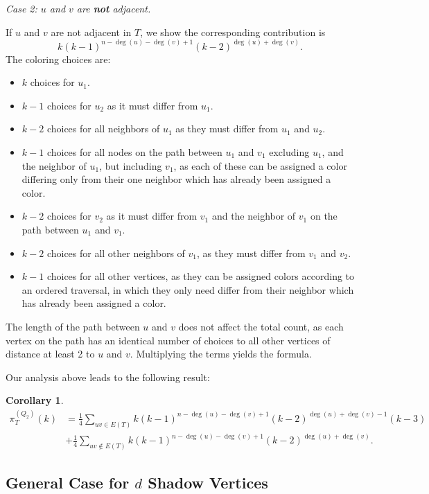 \documentclass[12pt,reqno,dvipsnames]{amsart}
\newtheorem{cor}[theorem]{Corollary}
\theoremstyle{definition}
\begin{document}
\smallskip 

\noindent\textit{Case 2: $u$ and $v$ are \textbf{not} adjacent.}

If $u$ and $v$ are not adjacent in $T$, we show the corresponding contribution is
$$
k (k - 1)^{n - \deg(u) - \deg(v) + 1} (k - 2)^{\deg(u) + \deg(v)}.
$$
The coloring choices are:
\begin{itemize}
    \item $k$ choices for $u_1$.
    \item $k - 1$ choices for $u_2$ as it must differ from $u_1$.
    \item $k - 2$ choices for all neighbors of $u_1$ as they must differ from $u_1$ and $u_2$.
    \item $k - 1$ choices for all nodes on the path between $u_1$ and $v_1$ excluding $u_1$, and the neighbor of $u_1$, but including $v_1$, as each of these can be assigned a color differing only from their one neighbor which has already been assigned a color.
    \item $k - 2$ choices for $v_2$ as it must differ from $v_1$ and the neighbor of $v_1$ on the path between $u_1$ and $v_1$.
    \item $k - 2$ choices for all other neighbors of $v_1$, as they must differ from $v_1$ and $v_2$.
    \item $k - 1$ choices for all other vertices, as they can be assigned colors according to an ordered traversal, in which they only need differ from their neighbor which has already been assigned a color.
\end{itemize}
The length of the path between $u$ and $v$ does not affect the total count, as each vertex on the path has an identical number of choices to all other vertices of distance at least 2 to $u$ and $v$. Multiplying the terms yields the formula.

Our analysis above leads to the following result:
\begin{cor}
\begin{align*}
    \pi^{(Q_2)}_T(k)&= \frac{1}{4}\sum_{uv\in E(T)} k (k - 1)^{n - \deg(u) - \deg(v) + 1} (k - 2)^{\deg(u) + \deg(v) - 1} (k - 3) \\ 
    & + \frac{1}{4}\sum_{uv\notin E(T)}k (k - 1)^{n - \deg(u) - \deg(v) + 1} (k - 2)^{\deg(u) + \deg(v)}.
\end{align*}
\end{cor}

\subsection{General Case for \texorpdfstring{$d$}{d} Shadow Vertices}
\end{document}
